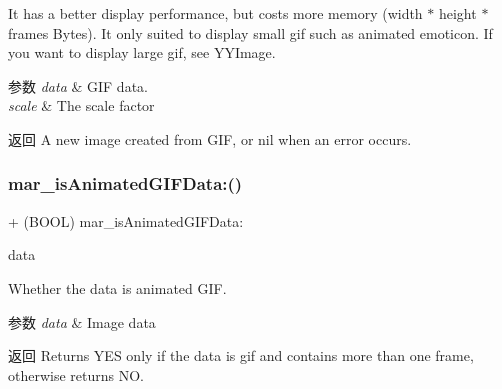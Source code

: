 It has a better display performance, but costs more memory (width $\ast$ height $\ast$ frames Bytes). It only suited to display small gif such as animated emoticon. If you want to display large gif, see {\ttfamily Y\+Y\+Image}.


\begin{DoxyParams}{参数}
{\em data} & G\+IF data.\\
\hline
{\em scale} & The scale factor\\
\hline
\end{DoxyParams}
\begin{DoxyReturn}{返回}
A new image created from G\+IF, or nil when an error occurs. 
\end{DoxyReturn}
\mbox{\label{category_u_i_image_07_m_a_r_e_x_08_ac34aa1dec41b75dfa98c1392ecef1d66}} 
\subsubsection{\texorpdfstring{mar\+\_\+is\+Animated\+G\+I\+F\+Data\+:()}{mar\_isAnimatedGIFData:()}}
{\footnotesize\ttfamily + (B\+O\+OL) mar\+\_\+is\+Animated\+G\+I\+F\+Data\+: \begin{DoxyParamCaption}\item[{(N\+S\+Data $\ast$)}]{data }\end{DoxyParamCaption}}

Whether the data is animated G\+IF.


\begin{DoxyParams}{参数}
{\em data} & Image data\\
\hline
\end{DoxyParams}
\begin{DoxyReturn}{返回}
Returns Y\+ES only if the data is gif and contains more than one frame, otherwise returns NO. 
\end{DoxyReturn}
\mbox{\label{category_u_i_image_07_m_a_r_e_x_08_a7f5d4aec9d1a0e7efc85daf3e7f8c9a0}} 
